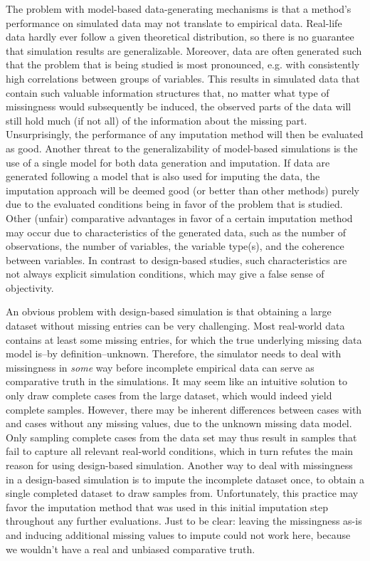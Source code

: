 \documentclass[bimj,fleqn]{w-art}
\begin{document}
The problem with model-based data-generating mechanisms is that a method's performance on simulated data may not translate to empirical data. Real-life data hardly ever follow a given theoretical distribution, so there is no guarantee that simulation results are generalizable. Moreover, data are often generated such that the problem that is being studied is most pronounced, e.g. with consistently high correlations between groups of variables. This results in simulated data that contain such valuable information structures that, no matter what type of missingness would subsequently be induced, the observed parts of the data will still hold much (if not all) of the information about the missing part. Unsurprisingly, the performance of any imputation method will then be evaluated as good. Another threat to the generalizability of model-based simulations is the use of a single model for both data generation and imputation. If data are generated following a model that is also used for imputing the data, the imputation approach will be deemed good (or better than other methods) purely due to the evaluated conditions being in favor of the problem that is studied. Other (unfair) comparative advantages in favor of a certain imputation method may occur due to characteristics of the generated data, such as the number of observations, the number of variables, the variable type(s), and the coherence between variables. In contrast to design-based studies, such characteristics are not always explicit simulation conditions, which may give a false sense of objectivity.

An obvious problem with design-based simulation is that obtaining a large dataset without missing entries can be very challenging. Most real-world data contains at least some missing entries, for which the true underlying missing data model is--by definition--unknown. Therefore, the simulator needs to deal with missingness in \textit{some} way before incomplete empirical data can serve as comparative truth in the simulations. It may seem like an intuitive solution to only draw complete cases from the large dataset, which would indeed yield complete samples. However, there may be inherent differences between cases with and cases without any missing values, due to the unknown missing data model. Only sampling complete cases from the data set may thus result in samples that fail to capture all relevant real-world conditions, which in turn refutes the main reason for using design-based simulation. Another way to deal with missingness in a design-based simulation is to impute the incomplete dataset once, to obtain a single completed dataset to draw samples from. Unfortunately, this practice may favor the imputation method that was used in this initial imputation step throughout any further evaluations. Just to be clear: leaving the missingness as-is and inducing additional missing values to impute could not work here, because we wouldn't have a real and unbiased comparative truth.
\end{document}
